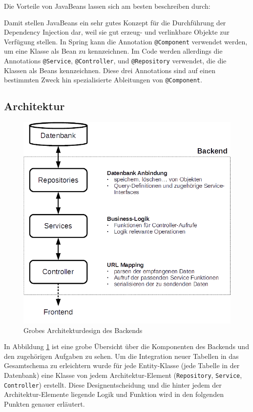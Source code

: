 Die Vorteile von JavaBeans lassen sich am besten beschreiben durch:


Damit stellen JavaBeans ein sehr gutes Konzept für die Durchführung der Dependency Injection dar, weil sie gut erzeug- und verlinkbare Objekte zur Verfügung stellen. In Spring kann die Annotation \verb|@Component| verwendet werden, um eine Klasse als Bean zu kennzeichnen. Im Code werden allerdings die Annotations \verb|@Service|, \verb|@Controller|, und \verb|@Repository| verwendet, die die Klassen als Beans kennzeichnen. Diese drei Annotations sind auf einen bestimmten Zweck hin spezialisierte Ableitungen von \verb|@Component|.

\subsection{Architektur}

\begin{figure}[h]
\centering
\includegraphics[width=0.8\linewidth]{3_backend/pics/architecture}
\caption{Grobes Architekturdesign des Backends}
\label{fig:architecture_backend}
\end{figure}

In Abbildung \ref{fig:architecture_backend} ist eine grobe Übersicht über die Komponenten des Backends und den zugehörigen Aufgaben zu sehen. Um die Integration neuer Tabellen in das Gesamtschema zu erleichtern wurde für jede Entity-Klasse (jede Tabelle in der Datenbank) eine Klasse von jedem Architektur-Element (\verb|Repository|, \verb|Service|, \verb|Controller|) erstellt. Diese Designentscheidung und die hinter jedem der Architektur-Elemente liegende Logik und Funktion wird in den folgenden Punkten genauer erläutert.

